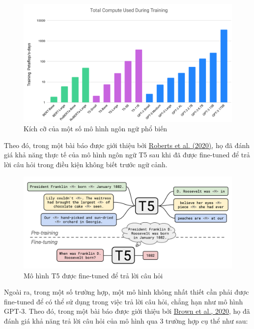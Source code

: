 \begin{figure}[h!]
    \centering
    \includegraphics[width=\linewidth]{img/arch/LM-compute.png}
    \caption{Kích cỡ của một số mô hình ngôn ngữ phổ biến}
    \label{fig:arch_lm}
\end{figure}

Theo đó, trong một bài báo được giới thiệu bởi \href{https://arxiv.org/abs/2002.08910}{Roberts et al. (2020)}, họ đã đánh giá khả năng thực tế của mô hình ngôn ngữ T5 sau khi đã được fine-tuned để trả lời câu hỏi trong điều kiện không biết trước ngữ cảnh.

\begin{figure}[h!]
    \centering
    \includegraphics[width=\linewidth]{img/arch/T5_SSM.png}
    \caption{Mô hình T5 được fine-tuned để trả lời câu hỏi}
    \label{fig:arch_t5}
\end{figure}

Ngoài ra, trong một số trường hợp, một mô hình không nhất thiết cần phải được fine-tuned để có thể sử dụng trong việc trả lời câu hỏi, chẳng hạn như mô hình GPT-3. Theo đó, trong một bài báo được giới thiệu bởi \href{https://arxiv.org/abs/2005.14165}{Brown et al., 2020}, họ đã đánh giá khả năng trả lời câu hỏi của mô hình qua 3 trường hợp cụ thể như sau:

